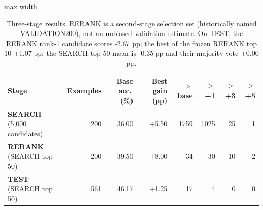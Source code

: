 \begin{table}[t]
\centering
\small
\begin{adjustbox}{max width=\linewidth}
\begin{tabular}{lrrrrrrr}
\toprule
Stage & Examples & Base acc.\,(\%) & Best gain (pp) & $>$base & $\ge$+1 & $\ge$+3 & $\ge$+5 \\
\midrule
\textbf{SEARCH} (5{,}000 candidates) & 200 & 36.00 & +5.50 & 1759 & 1025 & 25 & 1 \\
\textbf{RERANK} (SEARCH top 50) & 200 & 39.50 & +8.00 & 34 & 30 & 10 & 2 \\
\textbf{TEST} (SEARCH top 50) & 561 & 46.17 & +1.25 & 17 & 4 & 0 & 0 \\
\bottomrule
\end{tabular}
\end{adjustbox}
\caption{Three-stage results. RERANK is a second-stage selection set (historically named VALIDATION200), not an unbiased validation estimate. On TEST, the RERANK rank-1 candidate scores -2.67 pp; the best of the frozen RERANK top 10 +1.07 pp; the SEARCH top-50 mean is -0.35 pp and their majority vote +0.00 pp.}
\label{tab:main}
\end{table}
